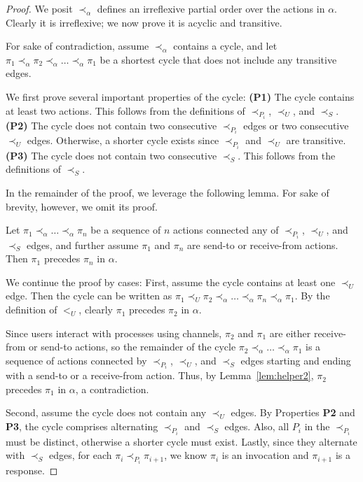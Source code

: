 \begin{proof}
We posit $\prec_{\alpha}$ defines an irreflexive partial order
over the actions in $\alpha$. Clearly it is irreflexive; we now prove
it is acyclic and transitive.

For sake of contradiction, assume $\prec_{\alpha}$ contains a cycle, and
let $\pi_1 \prec_{\alpha} \pi_2 \prec_{\alpha} \ldots \prec_{\alpha} \pi_1$
be a shortest cycle that does not include any transitive edges.

We first prove several important properties of the cycle:
\textbf{(P1)} The cycle contains at least two actions.
This follows from the definitions of $\prec_{P_i}$,
$\prec_U$, and $\prec_S$.
\textbf{(P2)} The cycle does not contain two consecutive
$\prec_{P_i}$ edges or two consecutive $\prec_U$ edges. Otherwise, a 
shorter cycle exists since $\prec_{P_i}$ and $\prec_U$ are transitive.
\textbf{(P3)} The cycle does not contain two consecutive $\prec_S$. This follows from the 
definitions of $\prec_S$.

In the remainder of the proof, we leverage the following lemma. 
For sake of brevity, however, we omit its proof.

\begin{lem}
    Let $\pi_1 \prec_{\alpha} \ldots \prec_{\alpha} \pi_n$
    be a sequence of $n$ actions connected any of
    $\prec_{P_i}$, $\prec_U$, and $\prec_S$ edges, and further
    assume $\pi_1$ and $\pi_n$ are send-to or receive-from actions.
    Then $\pi_1$ precedes $\pi_n$ in $\alpha$.
    \label{lem:helper2}
\end{lem}

We continue the proof by cases: First, assume the cycle contains at least one $\prec_U$ edge. Then the cycle can be
written as
$\pi_1 \prec_U \pi_2 \prec_{\alpha} \ldots \prec_{\alpha} \pi_n \prec_{\alpha} \pi_1$. By the definition of $<_U$, clearly $\pi_1$ precedes $\pi_2$ in $\alpha$.

Since users interact with processes using channels, $\pi_2$ and
$\pi_1$ are either receive-from or send-to actions,
so the remainder of the cycle
$\pi_2 \prec_{\alpha} \ldots \prec_{\alpha} \pi_1$
is a sequence of actions connected by $\prec_{P_i}$, $\prec_U$, and $\prec_S$ edges
starting and ending with a send-to or a receive-from action.
Thus, by Lemma~\ref{lem:helper2}, $\pi_2$ precedes $\pi_1$ in $\alpha$,
a contradiction.

Second, assume the cycle does not contain any $\prec_U$ edges.
By Properties \textbf{P2} and \textbf{P3}, the cycle comprises alternating
$\prec_{P_i}$ and $\prec_S$ edges. Also, all $P_i$ in the $\prec_{P_i}$
must be distinct, otherwise a shorter cycle must exist.
Lastly, since they alternate with $\prec_S$ edges,
for each $\pi_i \prec_{P_i} \pi_{i+1}$, we know 
$\pi_i$ is an invocation and $\pi_{i+1}$ is a response.


\end{proof}
